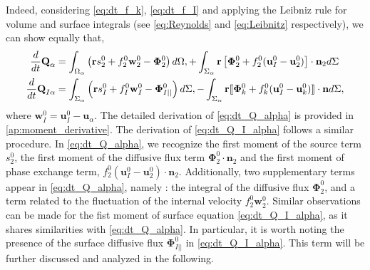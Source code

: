 Indeed, considering \ref{eq:dt_f_k}, \ref{eq:dt_f_I} and applying the Leibniz rule for volume and surface integrals (see \ref{eq:Reynolds} and \ref{eq:Leibnitz} respectively), we can show equally that,
\begin{align}
    \frac{d}{d t} {\textbf{Q}_\alpha}
    &= \int_{\Omega_\alpha}  \left(
        \textbf{r} s_2^0         
        + f_2^0  \textbf{w}_2^0 
        - \mathbf{\Phi}_2^0
    \right)  d\Omega,
    + \int_{\Sigma_\alpha}  \textbf{r} \left[
        \mathbf{\Phi}_2^0
        + f_2^0 (\textbf{u}_I^0-\textbf{u}_2^0)
    \right]\cdot \textbf{n}_2   d\Sigma 
    \label{eq:dt_Q_alpha}\\
    \frac{d}{d t} {\textbf{Q}_{I\alpha}}
    &= \int_{\Sigma_\alpha}  \left(
        \textbf{r}s_I^0
        + f_I^0 \textbf{w}_I^0
        - \mathbf{\Phi}_{I||}^0
    \right)  d\Sigma,
    - \int_{\Sigma_\alpha} \textbf{r} 
    \llbracket \mathbf{\Phi}_k^0
        + f_k^0 (\textbf{u}_I^0 - \textbf{u}_k^0)
     \rrbracket \cdot \textbf{n}
     d\Sigma,
    \label{eq:dt_Q_I_alpha}
\end{align}
where $\textbf{w}_I^0 = \textbf{u}_I^0 - \textbf{u}_\alpha$.
The detailed derivation of \ref{eq:dt_Q_alpha} is provided in \ref{ap:moment_derivative}.
The derivation of \ref{eq:dt_Q_I_alpha} follows a similar procedure. 
In \ref{eq:dt_Q_alpha}, we recognize the first moment of the source term $s_2^0$, the first moment of the diffusive flux term $\mathbf{\Phi}_2^0\cdot\textbf{n}_2$ and the first moment of phase exchange term, $f_2^0 (\textbf{u}_I^0-\textbf{u}_2^0)\cdot\textbf{n}_2$. 
Additionally, two supplementary terms appear in \ref{eq:dt_Q_alpha}, namely : the integral of the diffusive flux $\mathbf{\Phi}_2^0$, and a term related to the fluctuation of the internal velocity $f_2^0 \textbf{w}_2^0$.
Similar observations can be made for the fist moment of surface equation \ref{eq:dt_Q_I_alpha}, as it shares similarities with \ref{eq:dt_Q_alpha}. 
In particular, it is worth noting the presence of the surface diffusive flux $\mathbf{\Phi}_{I||}^0$ in \ref{eq:dt_Q_I_alpha}.
This term will be further discussed and analyzed in the following. 

